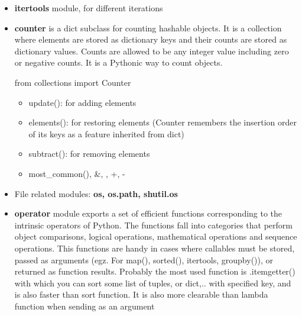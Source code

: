 \documentclass[
  letterpaper,
  DIV=11,
  numbers=noendperiod]{scrreprt}
\providecommand{\tightlist}{%
  \setlength{\itemsep}{0pt}\setlength{\parskip}{0pt}}\usepackage{longtable,booktabs,array}
\begin{document}
\begin{itemize}
\item
  \textbf{itertools} module, for different iterations
\item
  \textbf{counter} is a dict subclass for counting hashable objects. It
  is a collection where elements are stored as dictionary keys and their
  counts are stored as dictionary values. Counts are allowed to be any
  integer value including zero or negative counts. It is a Pythonic way
  to count objects.

  from collections import Counter

  \begin{itemize}
  \tightlist
  \item
    update(): for adding elements
  \item
    elements(): for restoring elements (Counter remembers the insertion
    order of its keys as a feature inherited from dict)
  \item
    subtract(): for removing elements
  \item
    most\_common(), \&, \textbar, +, -
  \end{itemize}
\item
  File related modules: \textbf{os, os.path, shutil.os}
\item
  \textbf{operator} module exports a set of efficient functions
  corresponding to the intrinsic operators of Python. The functions fall
  into categories that perform object comparisons, logical operations,
  mathematical operations and sequence operations. This functions are
  handy in cases where callables must be stored, passed as arguments
  (egz. For map(), sorted(), itertools, groupby()), or returned as
  function results. Probably the most used function is .itemgetter()
  with which you can sort some list of tuples, or dict,.. with specified
  key, and is also faster than sort function. It is also more clearable
  than lambda function when sending as an argument


\end{itemize}
\end{document}
